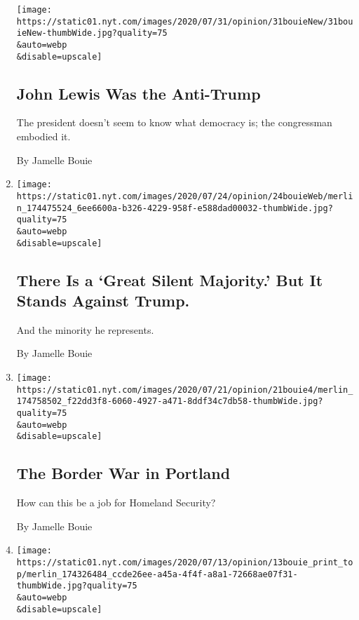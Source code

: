 \begin{enumerate}
  \texttt{[image: https://static01.nyt.com/images/2020/07/31/opinion/31bouieNew/31bouieNew-thumbWide.jpg?quality=75\\\&auto=webp\\\&disable=upscale]}

  \hypertarget{john-lewis-was-the-anti-trump}{%
  \subsection{John Lewis Was the
  Anti-Trump}\label{john-lewis-was-the-anti-trump}}

  The president doesn't seem to know what democracy is; the congressman
  embodied it.

  By Jamelle Bouie
\item
  \href{/2020/07/24/opinion/trump-silent-majority.html}{}

  \texttt{[image: https://static01.nyt.com/images/2020/07/24/opinion/24bouieWeb/merlin\_174475524\_6ee6600a-b326-4229-958f-e588dad00032-thumbWide.jpg?quality=75\\\&auto=webp\\\&disable=upscale]}

  \hypertarget{there-is-a-great-silent-majority-but-it-stands-against-trump}{%
  \subsection{There Is a `Great Silent Majority.' But It Stands Against
  Trump.}\label{there-is-a-great-silent-majority-but-it-stands-against-trump}}

  And the minority he represents.

  By Jamelle Bouie
\item
  \href{/2020/07/21/opinion/portland-homeland-security.html}{}

  \texttt{[image: https://static01.nyt.com/images/2020/07/21/opinion/21bouie4/merlin\_174758502\_f22dd3f8-6060-4927-a471-8ddf34c7db58-thumbWide.jpg?quality=75\\\&auto=webp\\\&disable=upscale]}

  \hypertarget{the-border-war-in-portland}{%
  \subsection{The Border War in
  Portland}\label{the-border-war-in-portland}}

  How can this be a job for Homeland Security?

  By Jamelle Bouie
\item
  \href{/2020/07/10/opinion/trump-schools-reopening.html}{}

  \texttt{[image: https://static01.nyt.com/images/2020/07/13/opinion/13bouie\_print\_top/merlin\_174326484\_ccde26ee-a45a-4f4f-a8a1-72668ae07f31-thumbWide.jpg?quality=75\\\&auto=webp\\\&disable=upscale]}


\end{enumerate}
